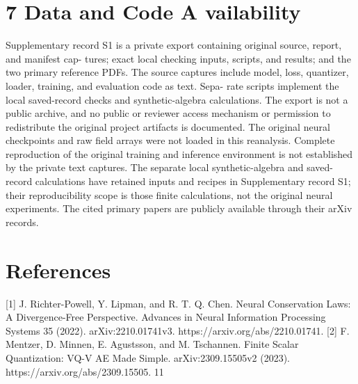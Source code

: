 \documentclass[11pt]{article}
\begin{document}
\section*{7 Data and Code A vailability}

Supplementary record S1 is a private export containing original source, report, and manifest cap-
tures; exact local checking inputs, scripts, and results; and the two primary reference PDFs. The
source captures include model, loss, quantizer, loader, training, and evaluation code as text. Sepa-
rate scripts implement the local saved-record checks and synthetic-algebra calculations. The export
is not a public archive, and no public or reviewer access mechanism or permission to redistribute
the original project artifacts is documented.
The original neural checkpoints and raw field arrays were not loaded in this reanalysis. Complete
reproduction of the original training and inference environment is not established by the private text
captures. The separate local synthetic-algebra and saved-record calculations have retained inputs
and recipes in Supplementary record S1; their reproducibility scope is those finite calculations, not
the original neural experiments. The cited primary papers are publicly available through their
arXiv records.

\section*{References}

[1] J. Richter-Powell, Y. Lipman, and R. T. Q. Chen. Neural Conservation Laws: A Divergence-Free
Perspective. Advances in Neural Information Processing Systems 35 (2022). arXiv:2210.01741v3.
https://arxiv.org/abs/2210.01741.
[2] F. Mentzer, D. Minnen, E. Agustsson, and M. Tschannen. Finite Scalar Quantization: VQ-V AE
Made Simple. arXiv:2309.15505v2 (2023). https://arxiv.org/abs/2309.15505.
11
\end{document}
